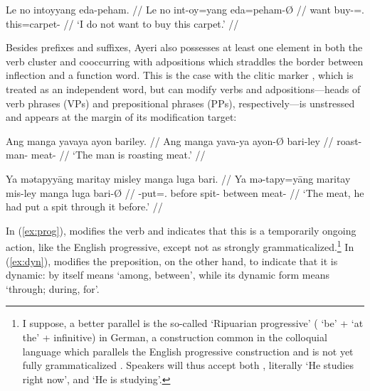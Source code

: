 \ex\begingl
	\gla Le no intoyyang eda-peham. //
	\glb Le no int-oy=yang eda=peham-Ø //
	\glc \PatTI{} want buy-\Neg{}=\Fsg{}.\Aarg{} this=carpet-\Top{} //
	\glft `I do not want to buy this carpet.' //
\endgl\xe

Besides prefixes and suffixes, Ayeri also possesses at least one element in
both the verb cluster and cooccurring with adpositions which straddles the
border between inflection and a function word. This is the case with the clitic
marker , which is treated as an independent word, but can
modify verbs and adpositions---heads of verb phrases (VPs) and prepositional
phrases (PPs), respectively---is unstressed and appears at the margin of its
modification target:

\pex
\a\label{ex:prog}\begingl
	\gla Ang manga yavaya ayon bariley. //
	\glb Ang manga yava-ya ayon-Ø bari-ley //
	\glc \AgtT{} \Prog{} roast-\TsgM{} man-\Top{} meat-\PargI{} //
	\glft `The man is roasting meat.' //
\endgl

\a\label{ex:dyn}\begingl
	\gla Ya mətapyyāng maritay misley manga luga bari. //
	\glb Ya mə-tapy=yāng maritay mis-ley manga luga bari-Ø //
	\glc \LocT{} \Pst{}-put=\TsgM{}.\Aarg{} before spit-\PargI{} \Dyn{} 
		between meat-\Top{} //
	\glft `The meat, he had put a spit through it before.' //
\endgl

\xe

In (\ref{ex:prog}),  modifies the verb 
and indicates that this is a temporarily ongoing action, like the English
progressive, except not as strongly grammaticalized.\footnote{I suppose, a
better parallel is the so-called  `Ripuarian
progressive' ( `be' +  `at the' + infinitive) in German, a
construction common in the colloquial language which parallels the English
progressive construction and is not yet fully grammaticalized
\citep[435]{dudengram2016}. Speakers will thus accept both , literally `He studies right now', and  `He is
studying'.
% 
}
%
In (\ref{ex:dyn}),  modifies the preposition, on the other 
hand, to indicate that it is dynamic:  by itself means `among, 
between', while its dynamic form  means `through; 
during, for'.

